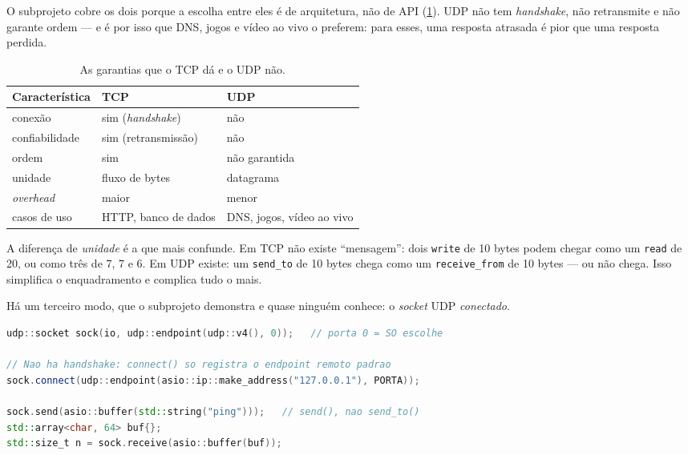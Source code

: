 O subprojeto cobre os dois porque a escolha entre eles é de arquitetura, não de
API (\cref{tab:tcp-udp}). UDP não tem \emph{handshake}, não retransmite e não
garante ordem --- e é por isso que DNS, jogos e vídeo ao vivo o preferem: para
esses, uma resposta atrasada é pior que uma resposta perdida.

\begin{table}[htbp]
\centering
\caption{As garantias que o TCP dá e o UDP não.}
\label{tab:tcp-udp}
\footnotesize
\begin{tabular}{@{}lll@{}}
\toprule
\textbf{Característica} & \textbf{TCP} & \textbf{UDP} \\
\midrule
conexão        & sim (\emph{handshake})   & não \\
confiabilidade & sim (retransmissão)      & não \\
ordem          & sim                      & não garantida \\
unidade        & fluxo de bytes           & datagrama \\
\emph{overhead}& maior                    & menor \\
casos de uso   & HTTP, banco de dados     & DNS, jogos, vídeo ao vivo \\
\bottomrule
\end{tabular}
\end{table}

A diferença de \emph{unidade} é a que mais confunde. Em TCP não existe
``mensagem'': dois \texttt{write} de 10 bytes podem chegar como um
\texttt{read} de 20, ou como três de 7, 7 e 6. Em UDP existe: um
\texttt{send\_to} de 10 bytes chega como um \texttt{receive\_from} de 10 bytes
--- ou não chega. Isso simplifica o enquadramento e complica tudo o mais.

Há um terceiro modo, que o subprojeto demonstra e quase ninguém conhece: o
\emph{socket} UDP \emph{conectado}.

\begin{lstlisting}[style=bt, language=C++,
    caption={\texttt{src/network/demo\_udp.hpp}, demo 3.3:
             \texttt{connect} em UDP não faz \emph{handshake} nenhum.}]
udp::socket sock(io, udp::endpoint(udp::v4(), 0));   // porta 0 = SO escolhe

// Nao ha handshake: connect() so registra o endpoint remoto padrao
sock.connect(udp::endpoint(asio::ip::make_address("127.0.0.1"), PORTA));

sock.send(asio::buffer(std::string("ping")));   // send(), nao send_to()
std::array<char, 64> buf{};
std::size_t n = sock.receive(asio::buffer(buf));
\end{lstlisting}

